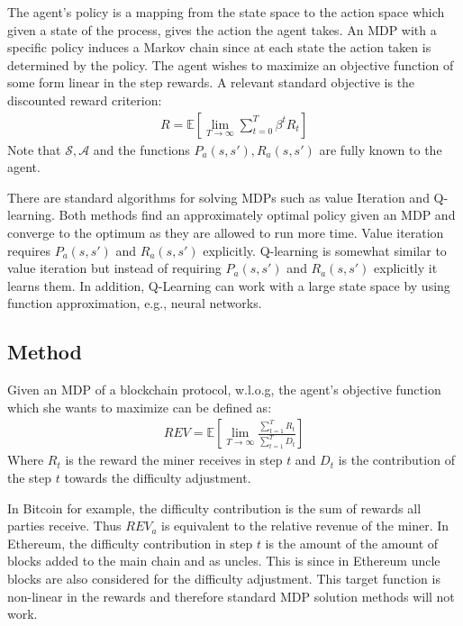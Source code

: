 \documentclass{article}
\newcommand{\E}[1]{\mathbb{E} \left[ #1 \right]}
\newcommand{\fancyS}{\mathcal{S}}
\newcommand{\fancyA}{\mathcal{A}}
\newcommand{\rev}{\textit{REV}}
\begin{document}
The agent's policy is a mapping from the state space to the action space which given a state of the process, gives the action the agent takes. An MDP with a specific policy induces a Markov chain since at each state the action taken is determined by the policy. The agent wishes to maximize an objective function of some form linear in the step rewards. A relevant standard objective is the discounted reward criterion:
\begin{gather*}
	R = \E{\lim\limits_{T \to \infty} \sum\limits_{t=0}^T \beta^t R_t}
\end{gather*}
Note that $\fancyS, \fancyA$ and the functions $P_a(s, s'), R_a(s, s')$ are fully known to the agent.

There are standard algorithms for solving MDPs such as value Iteration and Q-learning. Both methods find an approximately optimal policy given an MDP and converge to the optimum as they are allowed to run more time.
Value iteration requires  $P_a(s, s')$ and $R_a(s, s')$ explicitly.
Q-learning is somewhat similar to value iteration but instead of requiring $P_a(s, s')$ and $R_a(s, s')$ explicitly it learns them. In addition, Q-Learning can work with a large state space by using function approximation, e.g., neural networks.

\subsection{Method}
Given an MDP of a blockchain protocol, w.l.o.g, the agent's objective function which she wants to maximize can be defined as:
\begin{gather*}
   \rev = \E{\lim\limits_{T\to\infty} \frac{\sum\limits_{t=1}^T R_t}{\sum\limits_{t=1}^T D_t}}
\end{gather*}
Where $R_t$ is the reward the miner receives in step $t$ and $D_t$ is the contribution of the step $t$ towards the difficulty adjustment.

In Bitcoin for example, the difficulty contribution is the sum of rewards all parties receive. Thus $\rev_a$ is equivalent to the relative revenue of the miner. In Ethereum, the difficulty contribution in step $t$ is the amount of the amount of blocks added to the main chain and as uncles. This is since in Ethereum uncle blocks are also considered for the difficulty adjustment. This target function is non-linear in the rewards and therefore standard MDP solution methods will not work.
\end{document}
